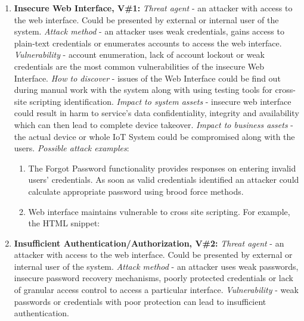 \documentclass[12pt]{article}
\begin{document}
\begin{enumerate}
	\item \textbf{Insecure Web Interface, V\#1:}
		\newline \textit{Threat agent} - an attacker with access to the web interface. Could be presented by external or internal user of the system.
		\newline \textit{Attack method} - an attacker uses weak credentials, gains access to plain-text credentials or enumerates accounts to access the web interface.
		\newline \textit{Vulnerability} - account enumeration, lack of account lockout or weak credentials	are the most common vulnerabilities of the insecure Web Interface.
		\newline \textit{How to discover} - issues of the Web Interface could be find out during manual work with the system along with using testing tools for cross-site scripting identification.
		\newline \textit{Impact to system assets} - insecure web interface could result in harm to service’s data confidentiality, integrity and availability which can then lead to complete device takeover.
		\newline \textit{Impact to business assets} - the actual device or whole IoT System could be compromised along with the users.
		\newline \textit{Possible attack examples}:
			\begin{enumerate}[label=(\roman*)]
				\item The Forgot Password functionality provides responses on entering invalid users’ credentials. As soon as valid credentials identified an attacker could calculate appropriate password using
				brood force methods.
				\item Web interface maintains vulnerable to cross site scripting. For example, the HTML snippet: 
			\end{enumerate}
	\item  \textbf{Insufficient Authentication/Authorization, V\#2:}
		\newline \textit{Threat agent} - an attacker with access to the web interface. Could be presented by external or internal user of the system.
		\newline \textit{Attack method} - an attacker uses weak passwords, insecure password recovery mechanisms, poorly protected credentials or lack of granular access control to access a particular interface.
		\newline \textit{Vulnerability} - weak passwords or credentials with poor protection can lead to insufficient authentication.

\end{enumerate}
\end{document}
